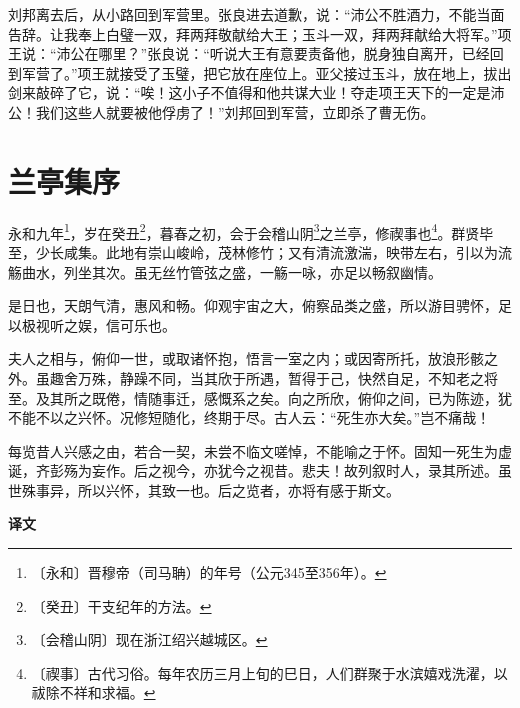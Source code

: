 \documentclass[12pt,UTF-8,openany,a4]{ctexbook}
\begin{document}
\begin{large}
    刘邦离去后，从小路回到军营里。张良进去道歉，说：“沛公不胜酒力，不能当面告辞。让我奉上白璧一双，拜两拜敬献给大王；玉斗一双，拜两拜献给大将军。”项王说：“沛公在哪里？”张良说：“听说大王有意要责备他，脱身独自离开，已经回到军营了。”项王就接受了玉璧，把它放在座位上。亚父接过玉斗，放在地上，拔出剑来敲碎了它，说：“唉！这小子不值得和他共谋大业！夺走项王天下的一定是沛公！我们这些人就要被他俘虏了！”刘邦回到军营，立即杀了曹无伤。
    
\end{large}



\chapter{兰亭集序}

\begin{large}
    
    永和九年\footnote{〔永和〕\yiwen 晋穆帝（司马聃）的年号（公元345至356年）。}，岁在癸丑\footnote{〔癸丑〕\yiwen 干支纪年的方法。}，暮春之初，会于会稽山阴\footnote{〔会稽山阴〕\yiwen 现在浙江绍兴越城区。}之兰亭，修禊事也\footnote{〔禊事〕\yiwen 古代习俗。每年农历三月上旬的巳日，人们群聚于水滨嬉戏洗濯，以祓除不祥和求福。}。群贤毕至，少长咸集。此地有崇山峻岭，茂林修竹；又有清流激湍，映带左右，引以为流觞曲水，列坐其次。虽无丝竹管弦之盛，一觞一咏，亦足以畅叙幽情。
    
    是日也，天朗气清，惠风和畅。仰观宇宙之大，俯察品类之盛，所以游目骋怀，足以极视听之娱，信可乐也。
    
    夫人之相与，俯仰一世，或取诸怀抱，悟言一室之内；或因寄所托，放浪形骸之外。虽趣舍万殊，静躁不同，当其欣于所遇，暂得于己，快然自足，不知老之将至。及其所之既倦，情随事迁，感慨系之矣。向之所欣，俯仰之间，已为陈迹，犹不能不以之兴怀。况修短随化，终期于尽。古人云：“死生亦大矣。”岂不痛哉！
    
    每览昔人兴感之由，若合一契，未尝不临文嗟悼，不能喻之于怀。固知一死生为虚诞，齐彭殇为妄作。后之视今，亦犹今之视昔。悲夫！故列叙时人，录其所述。虽世殊事异，所以兴怀，其致一也。后之览者，亦将有感于斯文。
\end{large}


\newpage

\begin{Large}
    \noindent\textbf{译文}
\end{Large}


\vspace{1em}
\end{document}
